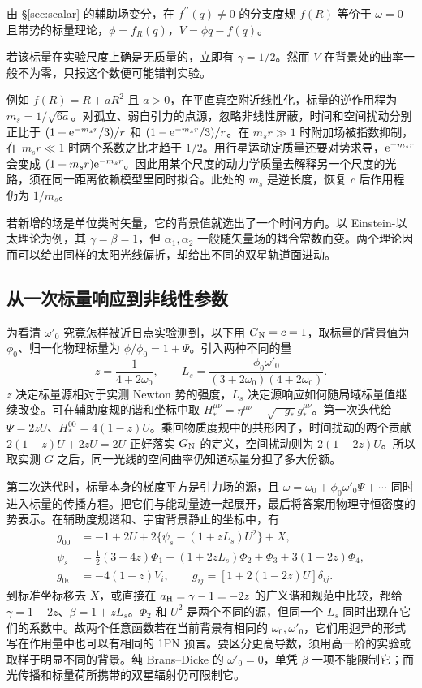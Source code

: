 由 \S\ref{sec:scalar} 的辅助场变分，在 $f^{\prime\prime}(q)\ne0$ 的分支度规 $f(R)$ 等价于 $\omega=0$ 且带势的标量理论，$\phi=f_R(q)$，$V=\phi q-f(q)$。

若该标量在实验尺度上确是无质量的，立即有 $\gamma=1/2$。然而 $V$ 在背景处的曲率一般不为零，只报这个数便可能错判实验。

例如 $f(R)=R+aR^2$ 且 $a>0$，在平直真空附近线性化，标量的逆作用程为 $m_s=1/\sqrt{6a}$。对孤立、弱自引力的点源，忽略非线性屏蔽，时间和空间扰动分别正比于 $(1+\mathrm{e}^{-m_s r}/3)/r$ 和 $(1-\mathrm{e}^{-m_s r}/3)/r$。在 $m_s r\gg1$ 时附加场被指数抑制，在 $m_s r\ll1$ 时两个系数之比才趋于 $1/2$。用行星运动定质量还要对势求导，$\mathrm{e}^{-m_s r}$ 会变成 $(1+m_s r)\mathrm{e}^{-m_s r}$。因此用某个尺度的动力学质量去解释另一个尺度的光路，须在同一距离依赖模型里同时拟合。此处的 $m_s$ 是逆长度，恢复 $c$ 后作用程仍为 $1/m_s$。

若新增的场是单位类时矢量，它的背景值就选出了一个时间方向。以 Einstein-以太理论为例，其 $\gamma=\beta=1$，但 $\alpha_1,\alpha_2$ 一般随矢量场的耦合常数而变。两个理论因而可以给出同样的太阳光线偏折，却给出不同的双星轨道面进动。

\subsection{从一次标量响应到非线性参数}\label{sec:pn-bd-aux}

为看清 $\omega'_0$ 究竟怎样被近日点实验测到，以下用 $G_{\rm N}=c=1$，取标量的背景值为 $\phi_0$、归一化物理标量为 $\phi/\phi_0=1+\Psi$。引入两种不同的量
\[
 z=\frac{1}{4+2\omega_0},\qquad
 L_s=\frac{\phi_0\omega'_0}{(3+2\omega_0)(4+2\omega_0)} .
\]
$z$ 决定标量源相对于实测 Newton 势的强度，$L_s$ 决定源响应如何随局域标量值继续改变。可在辅助度规的谐和坐标中取 $H_*^{\mu\nu}=\eta^{\mu\nu}-\sqrt{-g_*}g_*^{\mu\nu}$。第一次迭代给 $\Psi=2zU$、$H_*^{00}=4(1-z)U$。乘回物质度规中的共形因子，时间扰动的两个贡献 $2(1-z)U+2zU=2U$ 正好落实 $G_{\rm N}$ 的定义，空间扰动则为 $2(1-2z)U$。所以取实测 $G$ 之后，同一光线的空间曲率仍知道标量分担了多大份额。

第二次迭代时，标量本身的梯度平方是引力场的源，且 $\omega=\omega_0+\phi_0\omega'_0\Psi+\cdots$ 同时进入标量的传播方程。把它们与能动量迹一起展开，最后将答案用物理守恒密度的势表示。在辅助度规谐和、宇宙背景静止的坐标中，有
\begin{align*}
 g_{00}&=-1+2U+2\{\psi_s-(1+zL_s)U^2\}+\ddot X,\\
 \psi_s&=\tfrac12(3-4z)\Phi_1-(1+2zL_s)\Phi_2+\Phi_3+3(1-2z)\Phi_4,\\
 g_{0i}&=-4(1-z)V_i,\qquad g_{ij}=[1+2(1-2z)U]\delta_{ij}.
\end{align*}
到标准坐标移去 $\ddot X$，或直接在 $a_{\rm H}=\gamma-1=-2z$ 的广义谐和规范中比较，都给 $\gamma=1-2z$、$\beta=1+zL_s$。$\Phi_2$ 和 $U^2$ 是两个不同的源，但同一个 $L_s$ 同时出现在它们的系数中。故两个任意函数若在当前背景有相同的 $\omega_0,\omega'_0$，它们用迥异的形式写在作用量中也可以有相同的 1PN 预言。要区分更高导数，须用高一阶的实验或取样于明显不同的背景。纯 Brans--Dicke 的 $\omega'_0=0$，单凭 $\beta$ 一项不能限制它；而光传播和标量荷所携带的双星辐射仍可限制它。

